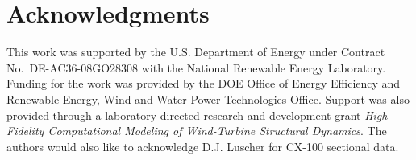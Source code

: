 \documentclass{aiaa-tc}
\begin{document}
\section*{Acknowledgments} 

This work was supported by the U.S. Department of Energy under Contract No.\
DE-AC36-08GO28308 with the National Renewable Energy Laboratory. Funding for the work was provided by the DOE Office of Energy Efficiency and Renewable Energy, Wind and Water Power Technologies Office. Support
was also provided through a laboratory directed research and development grant
\textit{High-Fidelity Computational Modeling of Wind-Turbine Structural
Dynamics}. The authors would also like to acknowledge D.J. Luscher for CX-100 sectional data.
  
  



\end{document}
